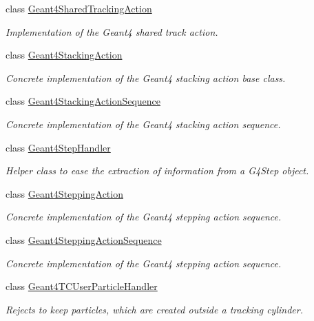 \begin{DoxyCompactItemize}
class \hyperlink{class_d_d4hep_1_1_simulation_1_1_geant4_shared_tracking_action}{Geant4\+Shared\+Tracking\+Action}
\begin{DoxyCompactList}\small\item\em Implementation of the Geant4 shared track action. \end{DoxyCompactList}\item 
class \hyperlink{class_d_d4hep_1_1_simulation_1_1_geant4_stacking_action}{Geant4\+Stacking\+Action}
\begin{DoxyCompactList}\small\item\em Concrete implementation of the Geant4 stacking action base class. \end{DoxyCompactList}\item 
class \hyperlink{class_d_d4hep_1_1_simulation_1_1_geant4_stacking_action_sequence}{Geant4\+Stacking\+Action\+Sequence}
\begin{DoxyCompactList}\small\item\em Concrete implementation of the Geant4 stacking action sequence. \end{DoxyCompactList}\item 
class \hyperlink{class_d_d4hep_1_1_simulation_1_1_geant4_step_handler}{Geant4\+Step\+Handler}
\begin{DoxyCompactList}\small\item\em Helper class to ease the extraction of information from a G4\+Step object. \end{DoxyCompactList}\item 
class \hyperlink{class_d_d4hep_1_1_simulation_1_1_geant4_stepping_action}{Geant4\+Stepping\+Action}
\begin{DoxyCompactList}\small\item\em Concrete implementation of the Geant4 stepping action sequence. \end{DoxyCompactList}\item 
class \hyperlink{class_d_d4hep_1_1_simulation_1_1_geant4_stepping_action_sequence}{Geant4\+Stepping\+Action\+Sequence}
\begin{DoxyCompactList}\small\item\em Concrete implementation of the Geant4 stepping action sequence. \end{DoxyCompactList}\item 
class \hyperlink{class_d_d4hep_1_1_simulation_1_1_geant4_t_c_user_particle_handler}{Geant4\+T\+C\+User\+Particle\+Handler}
\begin{DoxyCompactList}\small\item\em Rejects to keep particles, which are created outside a tracking cylinder. \end{DoxyCompactList}\item 

\end{DoxyCompactItemize}
